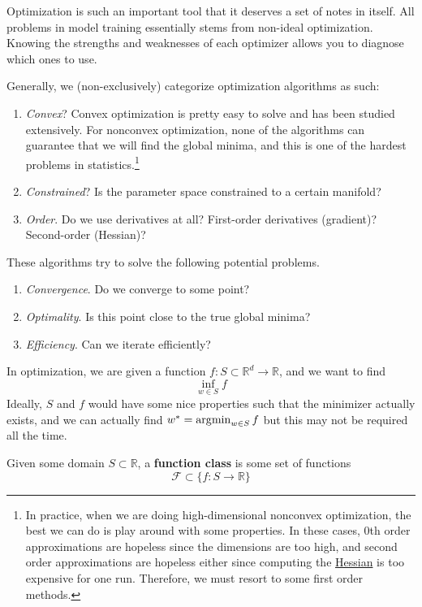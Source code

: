 Optimization is such an important tool that it deserves a set of notes in itself. All problems in model training essentially stems from non-ideal optimization. Knowing the strengths and weaknesses of each optimizer allows you to diagnose which ones to use. 

Generally, we (non-exclusively) categorize optimization algorithms as such: 
\begin{enumerate}
  \item \textit{Convex}? Convex optimization is pretty easy to solve and has been studied extensively. For nonconvex optimization, none of the algorithms can guarantee that we will find the global minima, and this is one of the hardest problems in statistics.\footnote{In practice, when we are doing high-dimensional nonconvex optimization, the best we can do is play around with some properties. In these cases, 0th order approximations are hopeless since the dimensions are too high, and second order approximations are hopeless either since computing the \hyperref[mv-def:hessian]{Hessian} is too expensive for one run. Therefore, we must resort to some first order methods. } 
  \item \textit{Constrained}? Is the parameter space constrained to a certain manifold? 
  \item \textit{Order}. Do we use derivatives at all? First-order derivatives (gradient)? Second-order (Hessian)? 
\end{enumerate}

These algorithms try to solve the following potential problems. 
\begin{enumerate}
  \item \textit{Convergence}. Do we converge to some point? 
  \item \textit{Optimality}. Is this point close to the true global minima?  
  \item \textit{Efficiency}. Can we iterate efficiently? 
\end{enumerate} 

In optimization, we are given a function $f: S \subset \mathbb{R}^d \to \mathbb{R}$, and we want to find 
\begin{equation}
	\inf_{w \in S} f
\end{equation}
Ideally, $S$ and $f$ would have some nice properties such that the minimizer actually exists, and we can actually find $w^\ast = \operatorname*{\arg\!\min}_{w \in S} f$ but this may not be required all the time. 

\begin{definition}
  \label{def:function-class}
	Given some domain $S \subset \mathbb{R}$, a \textbf{function class} is some set of functions 
	\begin{equation}
		\mathcal{F} \subset \{ f: S \to \mathbb{R} \}
	\end{equation}
\end{definition}

